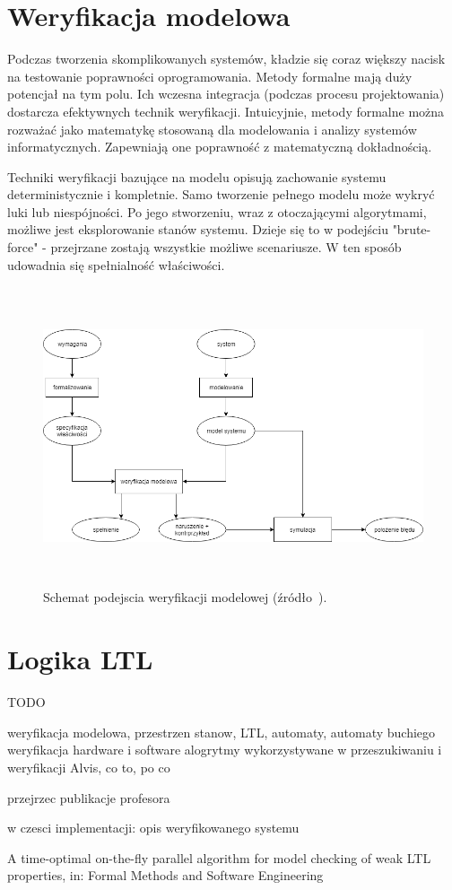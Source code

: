 \section{Weryfikacja modelowa}

Podczas tworzenia skomplikowanych systemów, kładzie się coraz większy nacisk na testowanie poprawności oprogramowania. Metody formalne mają duży potencjał na tym polu. Ich wczesna integracja (podczas procesu projektowania) dostarcza efektywnych technik weryfikacji.
Intuicyjnie, metody formalne można rozważać jako matematykę stosowaną dla modelowania i analizy systemów informatycznych. Zapewniają one poprawność z matematyczną dokładnością.

Techniki weryfikacji bazujące na modelu opisują zachowanie systemu deterministycznie i kompletnie. Samo tworzenie pełnego modelu może wykryć luki lub niespójności.
Po jego stworzeniu, wraz z otoczającymi algorytmami, możliwe jest eksplorowanie stanów systemu.
Dzieje się to w podejściu "brute-force" - przejrzane zostają wszystkie możliwe scenariusze.
W ten sposób udowadnia się spełnialność właściwości.




\begin{figure}[h]
    \centering
    \includegraphics[height=8.8cm,keepaspectratio]{img/model_checking_approach_schematic_view.png}
    \caption{Schemat podejscia weryfikacji modelowej (źródło~\cite{Bai08}).}
    \label{fig:model_checking_scheme}
\end{figure}


\section{Logika LTL}

TODO

weryfikacja modelowa, przestrzen stanow, LTL, automaty, automaty buchiego
weryfikacja hardware i software
alogrytmy wykorzystywane w przeszukiwaniu i weryfikacji
Alvis, co to, po co

\cite{Bar12} \cite{Jac05}
przejrzec publikacje profesora




w czesci implementacji:
opis weryfikowanego systemu


A time-optimal on-the-fly parallel algorithm for model checking of weak LTL properties, in: Formal Methods and Software Engineering

 
